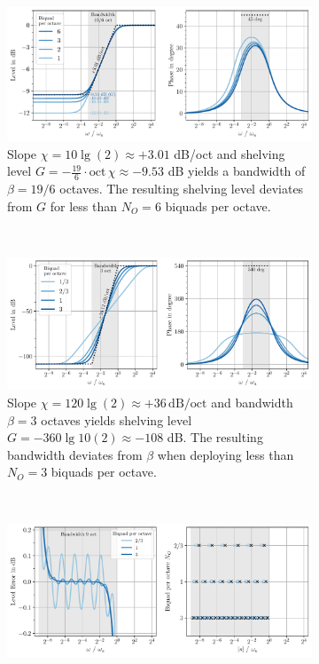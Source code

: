 \begin{figure}
\centering
\begin{subfigure}{0.8\textwidth}
\centering
\includegraphics[width=\textwidth]{../graphics/gain-error.pdf}
\caption{Slope $\chi = 10\lg(2)\approx +3.01$ dB/oct and shelving
level $G=-\frac{19}{6} \cdot \mathrm{oct} \, \chi \approx - 9.53$ dB yields a bandwidth
of $\beta = 19/6$ octaves.
The resulting shelving level deviates from $G$ for less than $N_O = 6$
biquads per octave.}
\label{fig:gain-error}
\end{subfigure}
\\
\begin{subfigure}{0.8\textwidth}
\centering
\includegraphics[width=\textwidth]{../graphics/slope-error.pdf}
\caption{Slope $\chi = 120 \lg(2) \approx +36\,\mathrm{dB/oct}$ and bandwidth $\beta=3$
octaves yields shelving level $G=-360\lg10(2) \approx -108$ dB.
The resulting bandwidth deviates from $\beta$ when deploying less than $N_O = 3$
biquads per octave.
}
\label{fig:slope-error}
\end{subfigure}
\\
\begin{subfigure}{0.8\textwidth}
\centering
\includegraphics[width=\textwidth]{../graphics/ripple-and-zp-frequency.pdf}

\end{subfigure}
\end{figure}
